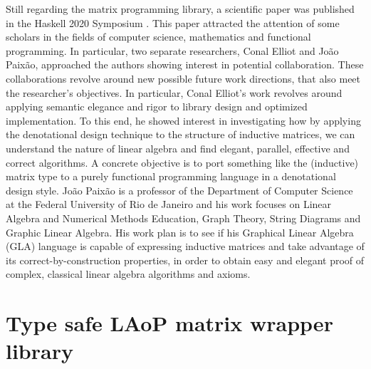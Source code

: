 \documentclass[
  oneside,
  11pt, a4paper,
  footinclude=true,
  headinclude=true,
  cleardoublepage=empty
]{scrbook}
\theoremstyle{definition}
\theoremstyle{definition}
\begin{document}
	     Still regarding the matrix programming library, a scientific paper was published in the Haskell 2020 Symposium \citep{Armando2020}. This paper attracted the attention of some scholars in the fields of computer science, mathematics and functional programming. In particular, two separate researchers, Conal Elliot and João Paixão, approached the authors showing interest in potential collaboration. These collaborations revolve around new possible future work directions, that also meet the researcher's objectives. In particular, Conal Elliot's work revolves around applying semantic elegance and rigor to library design and optimized implementation. To this end, he showed interest in investigating how by applying the denotational design technique to the structure of inductive matrices, we can understand the nature of linear algebra and find elegant, parallel, effective and correct algorithms. A concrete objective is to port something like the (inductive) matrix type to a purely functional programming language in a denotational design style. João Paixão is a professor of the Department of Computer Science at the Federal University of Rio de Janeiro and his work focuses on Linear Algebra and Numerical Methods Education, Graph Theory, String Diagrams and Graphic Linear Algebra. His work plan is to see if his Graphical Linear Algebra (GLA) language \citep{paixao2020calculational} is capable of expressing inductive matrices and take advantage of its correct-by-construction properties, in order to obtain easy and elegant proof of complex, classical linear algebra algorithms and axioms.
	     

	

	
	
	
	\chapter{Type safe LAoP matrix wrapper library}\label{appendix-a}
	
\end{document}
